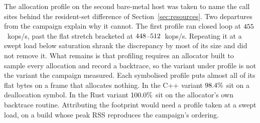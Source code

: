 \documentclass[english,oneside,a4paper,censored,csm,software-track-2020]{HYthesisML}
\begin{document}
\begin{appendices}
The allocation profile on the second bare-metal host was taken to name the call sites behind
the resident-set difference of Section~\ref{sec:resources}. Two departures from the campaign
explain why it cannot. The first profile ran closed loop at $455$~kops/s, past the
flat stretch bracketed at $448$--$512$~kops/s. Repeating it at a swept load below saturation
shrank the discrepancy by most of its size and did not remove it. What remains is that
profiling requires an allocator built to sample every allocation and record a backtrace, so the
variant under profile is not the variant the campaign measured. Each symbolised profile puts
almost all of its flat bytes on a frame that allocates nothing. In the C++ variant
$98.4\%$ sit on a deallocation symbol. In the Rust variant
$100.0\%$ sit on the allocator's own backtrace routine. Attributing the footprint
would need a profile taken at a swept load, on a build whose peak RSS reproduces the campaign's
ordering.

\end{appendices}

\clearpage
\end{document}
